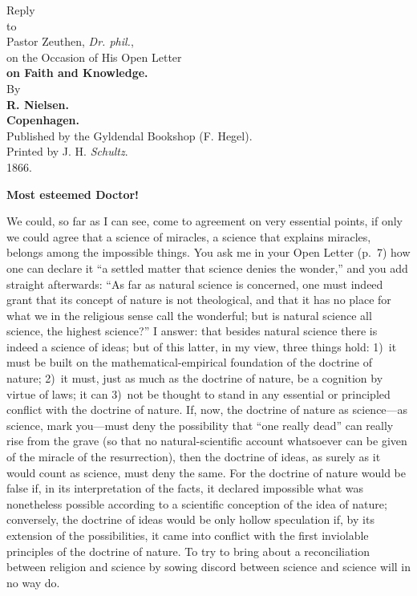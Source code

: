 \documentclass[12pt,a4paper]{article}
\newcommand{\opage}[1]{\marginnote{\footnotesize\textit{[#1]}}}
\begin{document}
\opage{1}%
\begin{center}
{\Huge Reply}\\[1.5em]
{\small to}\\[1.5em]
{\LARGE Pastor Zeuthen, \textit{Dr. phil.},}\\[1em]
{\large on the Occasion of His Open Letter}\\[1em]
{\Huge\bfseries on Faith and Knowledge.}\\[1em]
{\small By}\\[0.5em]
{\large\bfseries R. Nielsen.}\\[6em]
{\bfseries Copenhagen.}\\[0.5em]
Published by the Gyldendal Bookshop (F. Hegel).\\[0.3em]
{\footnotesize Printed by J. H. \emph{Schultz}.}\\[0.5em]
1866.
\end{center}
\clearpage
\opage{2}%
\begin{center}
{\large\bfseries Most esteemed Doctor!}
\end{center}

We could, so far as I can see, come to agreement on very
essential points, if only we could agree that a science of
miracles, a science that explains miracles, belongs among the
impossible things. You ask me in your Open Letter (p.~7) how one
can declare it ``a settled matter that science denies the wonder,''
and you add straight afterwards: ``As far as natural science is
concerned, one must indeed grant that its concept of nature is not
theological, and that it has no place for what we in the religious
sense call the wonderful; but is natural science all science, the
highest science?'' I answer: that besides natural science there is
indeed a science of ideas; but of this latter, in my view, three
things hold: 1)~it must be built on the mathematical-empirical
foundation of the doctrine of nature; 2)~it must, just as much as
the doctrine of nature, be a cognition by virtue of laws; it can
3)~not be thought to stand in any essential or principled conflict
with the doctrine of nature. If, now, the doctrine of nature as
science---as science, mark you---must deny the possibility that
``one really dead'' can really rise from the grave (so that no
natural-scientific account whatsoever can be given of the miracle
of the resurrection), then the doctrine of ideas, as surely as it
would count as science, must deny the same. For the doctrine of
nature would be false if, in its interpretation of the facts, it
declared impossible what was nonetheless possible according to a
scientific conception of the idea of nature; conversely,
\opage{3}the doctrine of ideas would be only hollow speculation if, by its
extension of the possibilities, it came into conflict with the
first inviolable principles of the doctrine of nature. To try to
bring about a reconciliation between religion and science by
sowing discord between science and science will in no way do.
\end{document}
